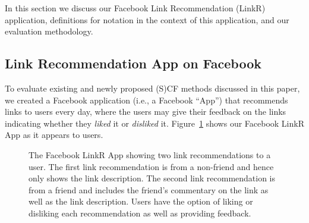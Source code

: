 In this section we discuss our Facebook Link Recommendation
(LinkR) application, definitions for 
notation in the context of this application, and our evaluation
methodology.

\subsection{Link Recommendation App on Facebook}

To evaluate existing and newly proposed (S)CF methods discussed in
this paper, we created a Facebook application (i.e., a Facebook
``App'') that recommends links to users every day, where the users may
give their feedback on the links indicating whether they \emph{liked}
it or \emph{disliked} it.  Figure~\ref{fig:linkr_app} shows 
our Facebook LinkR App as it appears to users.

\begin{figure}[t!]
\hspace{-2mm} 
\vspace{-8mm}
\caption{The Facebook LinkR App showing two link recommendations to a 
user.  The first link recommendation is from a non-friend and hence only
shows the link description.  The second link recommendation is from a
friend and includes the friend's commentary on the link as well as the
link description.  Users have the option of liking or disliking each
recommendation as well as providing feedback.}
\label{fig:linkr_app}
\end{figure}

